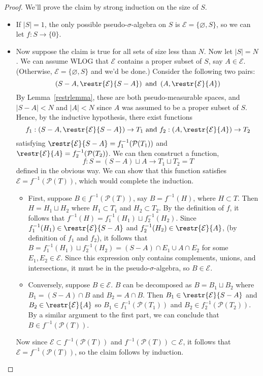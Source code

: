 \documentclass[11pt,letterpaper]{article}
\begin{document}
\begin{proof}
    We'll prove the claim by strong induction on the size of $S$.

    \begin{itemize}
        \item If $|S|=1$, the only possible pseudo-$\sigma$-algebra on $S$ is $\mathcal{E}=\{\varnothing, S\}$, so we can let $f : S \to \{0\}$.
        \item Now suppose the claim is true for all sets of size less than $N$. Now let $|S|=N$. We can assume WLOG that $\mathcal{E}$ contains a proper subset of $S$, say $A\in\mathcal{E}$. (Otherwise, $\mathcal{E}=\{\varnothing, S\}$ and we'd be done.) Consider the following two pairs:
        \[\left(S-A, \restr{\mathcal{E}}{S-A}\right)\textrm{ and }\left(A, \restr{\mathcal{E}   }{A}\right)\]
        By Lemma~\ref{restrlemma}, these are both pseudo-measurable spaces, and $|S-A|<N$ and $|A|<N$ since $A$ was assumed to be a proper subset of $S$. Hence, by the inductive hypothesis, there exist functions
        \[ f_1 : \left(S-A, \restr{\mathcal{E}}{S-A}\right) \to T_1\textrm{ and } f_2 : \left(A, \restr{\mathcal{E}}{A}\right) \to T_2 \]
        satisfying $\restr{\mathcal{E}}{S-A} = f_1^{-1}(\mathcal{P}(T_1))$ and $\restr{\mathcal{E}}{A} = f_2^{-1}(\mathcal{P}(T_2))$. We can then construct a function,
        \[ f : S = (S-A)\sqcup A \to T_1\sqcup T_2 = T\]
        defined in the obvious way. We can show that this function satisfies $\mathcal{E} = f^{-1}(\mathcal{P}(T))$, which would complete the induction.
        \begin{itemize}
            \item First, suppose $B\in f^{-1}(\mathcal{P}(T))$, say $B=f^{-1}(H)$, where $H\subset T$. Then $H=H_1\sqcup H_2$ where $H_1\subset T_1$ and $H_2\subset T_2$. By the definition of $f$, it follows that $f^{-1}(H)=f_1^{-1}(H_1)\sqcup f_2^{-1}(H_2)$. Since $f^{-1}_1(H_1)\in \restr{\mathcal{E}}{S-A}$ and $f^{-1}_2(H_2)\in \restr{\mathcal{E}}{A}$, (by definition of $f_1$ and $f_2$), it follows that $B = f_1^{-1}(H_1)\sqcup f_2^{-1}(H_2) = (S-A)\cap E_1 \cup A\cap E_2$ for some $E_1, E_2\in \mathcal{E}$. Since this expression only contains complements, unions, and intersections, it must be in the pseudo-$\sigma$-algebra, so $B\in \mathcal{E}$.
            \item Conversely, suppose $B\in \mathcal{E}$. $B$ can be decomposed as $B=B_1\sqcup B_2$ where $B_1=(S-A)\cap B$ and $B_2=A\cap B$. Then $B_1\in \restr{\mathcal{E}}{S-A}$ and $B_2\in \restr{\mathcal{E}}{A}$ so $B_1\in f_1^{-1}(\mathcal{P}(T_1))$ and $B_2\in f_2^{-1}(\mathcal{P}(T_2))$. By a similar argument to the first part, we can conclude that $B\in f^{-1}(\mathcal{P}(T))$.
        \end{itemize}

        Now since $\mathcal{E} \subset f^{-1}(\mathcal{P}(T))$ and $f^{-1}(\mathcal{P}(T)) \subset \mathcal{E}$, it follows that $\mathcal{E} = f^{-1}(\mathcal{P}(T))$, so the claim follows by induction. \qedhere
    \end{itemize}
\end{proof}
\end{document}

